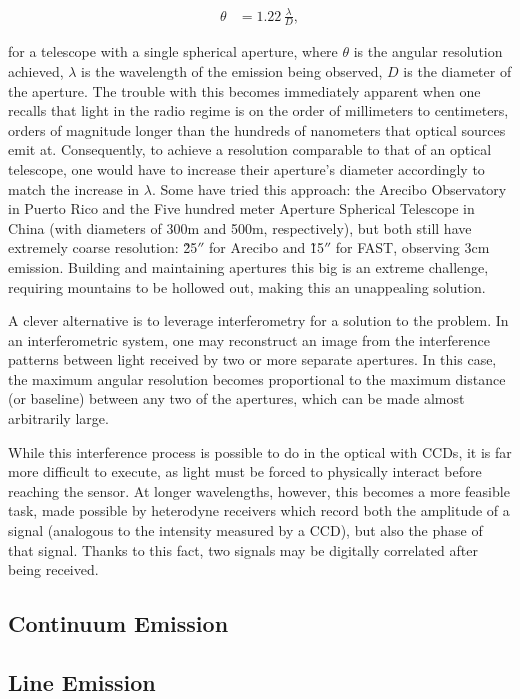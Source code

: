 \begin{align}
  \theta &= 1.22 \, \frac{\lambda}{D},
\end{align}

for a telescope with a single spherical aperture, where $\theta$ is the angular resolution achieved, $\lambda$ is the wavelength of the emission being observed, $D$ is the diameter of the aperture. The trouble with this becomes immediately apparent when one recalls that light in the radio regime is on the order of millimeters to centimeters, orders of magnitude longer than the hundreds of nanometers that optical sources emit at. Consequently, to achieve a resolution comparable to that of an optical telescope, one would have to increase their aperture's diameter accordingly to match the increase in $\lambda$. Some have tried this approach: the Arecibo Observatory in Puerto Rico and the Five hundred meter Aperture Spherical Telescope in China (with diameters of 300m and 500m, respectively), but both still have extremely coarse resolution: \~25$''$ for Arecibo and \~15$''$ for FAST, observing 3cm emission. Building and maintaining apertures this big is an extreme challenge, requiring mountains to be hollowed out, making this an unappealing solution.

A clever alternative is to leverage interferometry for a solution to the problem. In an interferometric system, one may reconstruct an image from the interference patterns between light received by two or more separate apertures. In this case, the maximum angular resolution becomes proportional to the maximum distance (or baseline) between any two of the apertures, which can be made almost arbitrarily large.

While this interference process is possible to do in the optical with CCDs, it is far more difficult to execute, as light must be forced to physically interact before reaching the sensor. At longer wavelengths, however, this becomes a more feasible task, made possible by heterodyne receivers which record both the amplitude of a signal (analogous to the intensity measured by a CCD), but also the phase of that signal. Thanks to this fact, two signals may be digitally correlated after being received.






\subsection{Continuum Emission}
\subsection{Line Emission}

